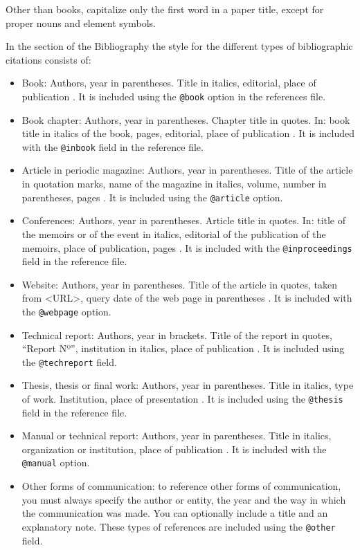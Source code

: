 \documentclass[eng]{ajceam-class}
\begin{document}
Other than books, capitalize only the first word in a paper title, except for proper nouns and element symbols.


In the section of the Bibliography the style for the different types of bibliographic citations consists of:

\begin{itemize}
 \item Book: Authors, year in parentheses. Title in italics, editorial, place of publication \cite{Alarcos1999}. It is included using the \texttt{@book} option in the references file.
%
 \item Book chapter: Authors, year in parentheses. Chapter title in quotes. In: book title in italics of the book, pages, editorial, place of publication \cite{Mitchell2001}. It is included with the \texttt{@inbook} field in the reference file.
%
 \item Article in periodic magazine: Authors, year in parentheses. Title of the article in quotation marks, name of the magazine in italics, volume, number in parentheses, pages \cite{ArslanHansen1996, WangEtAl2015}. It is included using the \texttt{@article} option.
%
 \item Conferences: Authors, year in parentheses. Article title in quotes. In: title of the memoirs or of the event in italics, editorial of the publication of the memoirs, place of publication, pages \cite{BarkovaJouvet1999}. It is included with the \texttt{@inproceedings} field in the reference file.
%
 \item Website: Authors, year in parentheses. Title of the article in quotes, taken from <URL>, query date of the web page in parentheses \cite{CFDwebpage}. It is included with the \texttt{@webpage} option.
%
 \item Technical report: Authors, year in brackets. Title of the report in quotes, ``Report Nº'', institution in italics, place of publication \cite{NACA460}. It is included using the \texttt{@techreport} field.
%
 \item Thesis, thesis or final work: Authors, year in parentheses. Title in italics, type of work. Institution, place of presentation \cite{Krause2014}. It is included using the \texttt{@thesis} field in the reference file.
%
 \item Manual or technical report: Authors, year in parentheses. Title in italics, organization or institution, place of publication \cite{Indura2010}. It is included with the \texttt{@manual} option.
%
 \item Other forms of communication: to reference other forms of communication, you must always specify the author or entity, the year and the way in which the communication was made. You can optionally include a title and an explanatory note. These types of references are included using the \texttt{@other} field.
\end{itemize}
\end{document}
